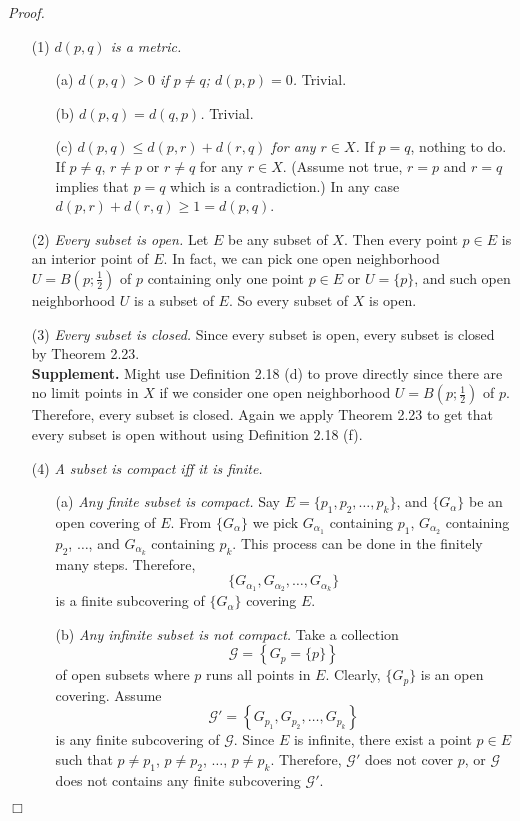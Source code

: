\documentclass{article}
\begin{document}
\emph{Proof.}
\begin{enumerate}
\item[(1)] \emph{$d(p, q)$ is a metric.}
\begin{enumerate}
\item[(a)] \emph{$d(p, q) > 0$ if $p \neq q$; $d(p, p) = 0$.} Trivial.
\item[(b)] \emph{$d(p, q) = d(q, p)$.} Trivial.
\item[(c)] \emph{$d(p, q) \leq d(p, r) + d(r, q)$ for any $r \in X$.}
If $p = q$, nothing to do. If $p \neq q$, $r \neq p$ or $r \neq q$ for any $r \in X$.
(Assume not true, $r = p$ and $r = q$ implies that $p = q$ which is a contradiction.)
In any case $d(p, r) + d(r, q) \geq 1 = d(p, q)$.
\end{enumerate}
\item[(2)] \emph{Every subset is open.}
Let $E$ be any subset of $X$.
Then every point $p \in E$ is an interior point of $E$.
In fact, we can pick one open neighborhood $U = B\left(p;\frac{1}{2}\right)$ of $p$
containing only one point $p \in E$ or $U = \{ p \}$,
and such open neighborhood $U$ is a subset of $E$.
So every subset of $X$ is open.
\item[(3)] \emph{Every subset is closed.}
Since every subset is open, every subset is closed by Theorem 2.23. \\

\textbf{Supplement.}
Might use Definition 2.18 (d) to prove directly since there are no limit points in $X$
if we consider one open neighborhood $U = B\left(p;\frac{1}{2}\right)$ of $p$.
Therefore, every subset is closed.
Again we apply Theorem 2.23 to get that every subset is open
without using Definition 2.18 (f).
\item[(4)] \emph{A subset is compact iff it is finite.}
\begin{enumerate}
\item[(a)]
\emph{Any finite subset is compact.}
Say $E = \{p_1, p_2, \ldots, p_k\}$, and $\{ G_{\alpha} \}$ be an open covering of $E$.
From $\{ G_{\alpha} \}$
we pick
$G_{\alpha_1}$ containing $p_1$,
$G_{\alpha_2}$ containing $p_2$, $\ldots$, and
$G_{\alpha_k}$ containing $p_k$.
This process can be done in the finitely many steps.
Therefore,
$$\{ G_{\alpha_1}, G_{\alpha_2}, \ldots, G_{\alpha_k} \}$$
is a finite subcovering of $\{ G_{\alpha} \}$ covering $E$.
\item[(b)]
\emph{Any infinite subset is not compact.}
Take a collection
$$\mathscr{G} = \left\{ G_p = \{ p \} \right\}$$
of open subsets where $p$ runs all points in $E$.
Clearly, $\{ G_p \}$ is an open covering.
Assume
$$\mathscr{G}' = \left\{ G_{p_1}, G_{p_2}, \ldots, G_{p_k} \right\}$$
is any finite subcovering of $\mathscr{G}$.
Since $E$ is infinite, there exist a point $p \in E$ such that
$p \neq p_1$,
$p \neq p_2$, $\ldots$,
$p \neq p_k$.
Therefore, $\mathscr{G}'$ does not cover $p$,
or $\mathscr{G}$ does not contains any finite subcovering $\mathscr{G}'$.
\end{enumerate}
\end{enumerate}
$\Box$ \\
\end{document}
